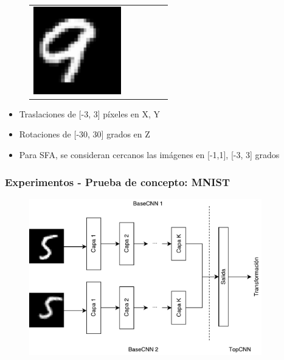 \documentclass{beamer}
\begin{document}
\begin{frame}[plain]
\begin{figure}
{\begin{tabular}{cccccc}
\includegraphics[width = 1.5in]{./images/mnist/c1.png}\\
\end{tabular}
}
\label{fig:mnist-sample}
\end{figure}
\vfill
\begin{itemize}
	\item Traslaciones de [-3, 3] píxeles en X, Y
	\item Rotaciones de [-30, 30] grados en Z
	\item Para SFA, se consideran cercanos las imágenes en [-1,1], [-3, 3] grados  
\end{itemize}

\end{frame}





\begin{frame}[plain]
\frametitle{Experimentos - Prueba de concepto: MNIST}
\begin{figure}
    \centering
    \includegraphics[width=0.9\textwidth]{images/siamese-example.pdf}
\end{figure}
\end{frame}
\end{document}
